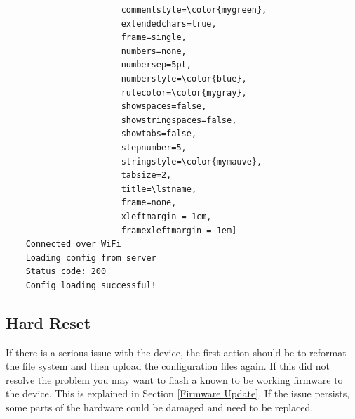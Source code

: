 \begin{enumerate}
\begin{lstlisting}
                       commentstyle=\color{mygreen}, 
                       extendedchars=true,              
                       frame=single,                   
                       numbers=none,                
                       numbersep=5pt,                   
                       numberstyle=\color{blue}, 
                       rulecolor=\color{mygray},        
                       showspaces=false,
                       showstringspaces=false,
                       showtabs=false,                 
                       stepnumber=5,                  
                       stringstyle=\color{mymauve},    
                       tabsize=2,                      
                       title=\lstname,
                       frame=none,
                       xleftmargin = 1cm,
                       framexleftmargin = 1em]
    Connected over WiFi
    Loading config from server
    Status code: 200
    Config loading successful!
    \end{lstlisting}
\end{enumerate}

\subsection{Hard Reset} \label{Hard Reset}
If there is a serious issue with the device, the first action should be to reformat the file system and then upload the configuration files again. If this did not resolve the problem you may want to flash a known to be working firmware to the device. This is explained in Section \ref{Firmware Update}. If the issue persists, some parts of the hardware could be damaged and need to be replaced.
